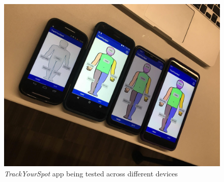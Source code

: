 \begin{figure}
    \includegraphics[width=1\textwidth, center]{figures/4devicestesting.jpg}
    \caption{\emph{TrackYourSpot} app being tested across different devices}
    \label{fig:4devicestesting}
\end{figure}

